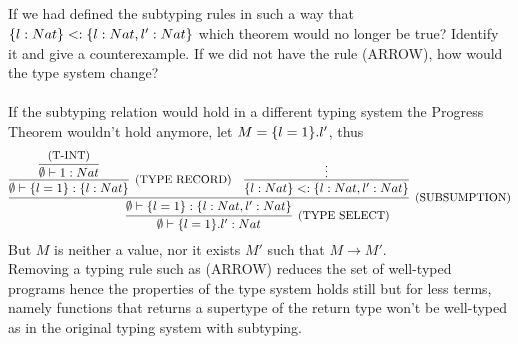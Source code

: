 \subsection{}

If we had defined the subtyping rules in such a way that $\{l: Nat\} <: \{l: Nat, l': Nat\}$
which theorem would no longer be true? Identify it and give a counterexample. If we did not have
the rule (ARROW), how would the type system change?\\~\\
If the subtyping relation would hold in a different typing system the Progress Theorem wouldn't
hold anymore, let $M = \{l=1\}.l'$, thus
\[
	\infer[\text{\small{(TYPE SELECT)}}]
	{\emptyset \vdash \SEL{\REC{l=1}}{l'}: Nat}
	{
		\infer[\text{\small{(SUBSUMPTION)}}]
		{\emptyset \vdash \REC{l=1}: \TREC{l: Nat,l': Nat}}
		{
			\infer[\text{\small{(TYPE RECORD)}}]
			{\emptyset \vdash \REC{l=1}: \TREC{l: Nat}}
			{
				\infer{\emptyset \vdash 1: Nat}{\text{\small{(T-INT)}}}
			} &
			\infer{ \TREC{l: Nat} <: \TREC{l: Nat, l': Nat} }{\vdots}
		}
	}
\]
But $M$ is neither a value, nor it exists $M'$ such that $M \to M'$.\\
Removing a typing rule such as (ARROW) reduces the set of well-typed
programs hence the properties of the type system holds still but for less terms, namely functions
that returns a supertype of the return type won't be well-typed as in the original typing system
with subtyping.
